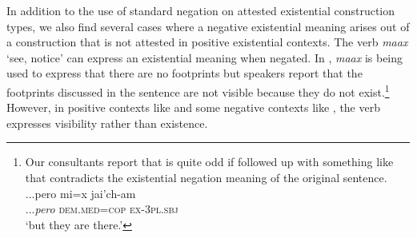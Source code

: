\documentclass[output=paper,draft,draftmode,colorlinks,citecolor=brown]{langscibook}
\begin{document}
In addition to the use of standard negation on attested existential construction types, we also find several cases where a negative existential meaning arises out of a construction that is not attested in positive existential contexts. The verb \emph{maax} ‘see, notice’ can express an existential meaning when negated. In , \emph{maax} is being used to express that there are no footprints but speakers report that the footprints discussed in the sentence are not visible because they do not exist.\footnote{Our
    consultants report that  is quite odd if followed up with something like  that contradicts the existential negation meaning of the original sentence.
    \ea\label{ex:odam-continuation}
    \gll ...pero mi=x jai'ch-am\\
    ...\emph{pero} \textsc{dem.med=cop} \textsc{ex-3pl.sbj}\\
    \glt  `but they are there.'
    \zlast
}
However, in positive contexts like  and some negative contexts like , the verb expresses visibility rather than existence.
\end{document}
